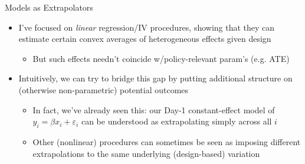 \documentclass[11pt,english]{beamer}
\begin{document}
\begin{frame}{Models as Extrapolators}
\begin{itemize}
\item I've focused on \emph{linear} regression/IV procedures, showing that they can estimate certain convex averages of heterogeneous effects given design\smallskip\pause
\begin{itemize}
\item But such effects needn't coincide w/policy-relevant param's (e.g. ATE)
\end{itemize}\bigskip\pause{}
\item Intuitively, we can try to bridge this gap by putting additional structure on (otherwise non-parametric) potential outcomes\smallskip\pause{}
\begin{itemize}
\item In fact, we've already seen this: our Day-1 constant-effect model of $y_i=\beta x_i+\varepsilon_i$ can be understood as extrapolating simply across all $i$\smallskip\pause{}
\item Other (nonlinear) procedures can sometimes be seen as imposing different extrapolations to the same underlying (design-based) variation
\end{itemize}
\end{itemize}
\end{frame}
\end{document}
